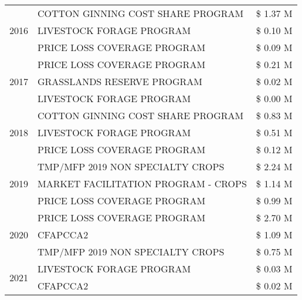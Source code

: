 \begin{tabular}{llr}
\cline{1-3}
\multirow[t]{3}{*}{2016} & COTTON GINNING COST SHARE PROGRAM             & \$ 1.37 M \\
 & LIVESTOCK FORAGE PROGRAM                      & \$ 0.10 M \\
 & PRICE LOSS COVERAGE PROGRAM                   & \$ 0.09 M \\
\cline{1-3}
\multirow[t]{3}{*}{2017} & PRICE LOSS COVERAGE PROGRAM & \$ 0.21 M \\
 & GRASSLANDS RESERVE PROGRAM & \$ 0.02 M \\
 & LIVESTOCK FORAGE PROGRAM & \$ 0.00 M \\
\cline{1-3}
\multirow[t]{3}{*}{2018} & COTTON GINNING COST SHARE PROGRAM & \$ 0.83 M \\
 & LIVESTOCK FORAGE PROGRAM & \$ 0.51 M \\
 & PRICE LOSS COVERAGE PROGRAM & \$ 0.12 M \\
\cline{1-3}
\multirow[t]{3}{*}{2019} & TMP/MFP 2019 NON SPECIALTY CROPS & \$ 2.24 M \\
 & MARKET FACILITATION PROGRAM - CROPS & \$ 1.14 M \\
 & PRICE LOSS COVERAGE PROGRAM & \$ 0.99 M \\
\cline{1-3}
\multirow[t]{3}{*}{2020} & PRICE LOSS COVERAGE PROGRAM & \$ 2.70 M \\
 & CFAPCCA2 & \$ 1.09 M \\
 & TMP/MFP 2019 NON SPECIALTY CROPS & \$ 0.75 M \\
\cline{1-3}
\multirow[t]{2}{*}{2021} & LIVESTOCK FORAGE PROGRAM & \$ 0.03 M \\
 & CFAPCCA2 & \$ 0.02 M \\
\cline{1-3}
\bottomrule
\end{tabular}
